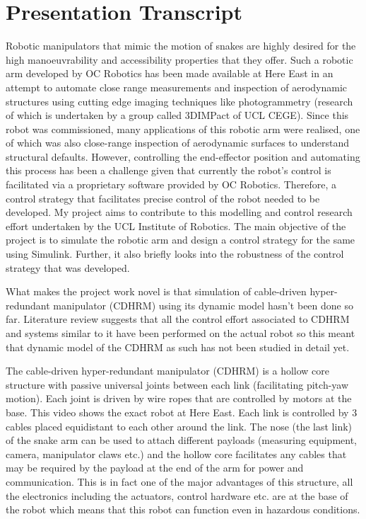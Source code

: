 \documentclass[a4paper,12pt]{article}
\begin{document}
\pagebreak

\section{Presentation Transcript}
Robotic manipulators that mimic the motion of snakes are highly desired for the high manoeuvrability and accessibility properties that they offer. Such a robotic arm developed by OC Robotics has been made available at Here East in an attempt to automate close range measurements and inspection of aerodynamic structures using cutting edge imaging techniques like photogrammetry (research of which is undertaken by a group called 3DIMPact of UCL CEGE). Since this robot was commissioned, many applications of this robotic arm were realised, one of which was also close-range inspection of aerodynamic surfaces to understand structural defaults. However, controlling the end-effector position and automating this process has been a challenge given that currently the robot’s control is facilitated via a proprietary software provided by OC Robotics. Therefore, a control strategy that facilitates precise control of the robot needed to be developed. My project aims to contribute to this modelling and control research effort undertaken by the UCL Institute of Robotics. The main objective of the project is to simulate the robotic arm and design a control strategy for the same using Simulink. Further, it also briefly looks into the robustness of the control strategy that was developed. 

What makes the project work novel is that simulation of cable-driven hyper-redundant manipulator (CDHRM) using its dynamic model hasn’t been done so far. Literature review suggests that all the control effort associated to CDHRM and systems similar to it have been performed on the actual robot so this meant that dynamic model of the CDHRM as such has not been studied in detail yet.
 
The cable-driven hyper-redundant manipulator (CDHRM) is a hollow core structure with passive universal joints between each link (facilitating pitch-yaw motion). Each joint is driven by wire ropes that are controlled by motors at the base. This video shows the exact robot at Here East. Each link is controlled by 3 cables placed equidistant to each other around the link. The nose (the last link) of the snake arm can be used to attach different payloads (measuring equipment, camera, manipulator claws etc.) and the hollow core facilitates any cables that may be required by the payload at the end of the arm for power and communication. This is in fact one of the major advantages of this structure, all the electronics including the actuators, control hardware etc. are at the base of the robot which means that this robot can function even in hazardous conditions.
\end{document}
